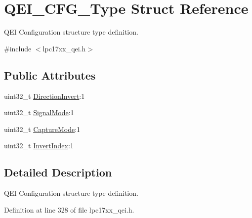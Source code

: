 \hypertarget{struct_q_e_i___c_f_g___type}{\section{\-Q\-E\-I\-\_\-\-C\-F\-G\-\_\-\-Type \-Struct \-Reference}
\label{struct_q_e_i___c_f_g___type}
}


\-Q\-E\-I \-Configuration structure type definition.  




{\ttfamily \#include $<$lpc17xx\-\_\-qei.\-h$>$}

\subsection*{\-Public \-Attributes}
\begin{DoxyCompactItemize}
\item 
uint32\-\_\-t \hyperlink{struct_q_e_i___c_f_g___type_a35b9e3c37c0a1e69f44f0180fa792c51}{\-Direction\-Invert}\-:1
\item 
uint32\-\_\-t \hyperlink{struct_q_e_i___c_f_g___type_a20b0f08f6a6549d99398ce3b654a022a}{\-Signal\-Mode}\-:1
\item 
uint32\-\_\-t \hyperlink{struct_q_e_i___c_f_g___type_a0d5fa4810afb88f7cd9b27b9b12e033d}{\-Capture\-Mode}\-:1
\item 
uint32\-\_\-t \hyperlink{struct_q_e_i___c_f_g___type_a91729828dfd03d8688b4b5f561bff9cb}{\-Invert\-Index}\-:1
\end{DoxyCompactItemize}


\subsection{\-Detailed \-Description}
\-Q\-E\-I \-Configuration structure type definition. 

\-Definition at line 328 of file lpc17xx\-\_\-qei.\-h.



